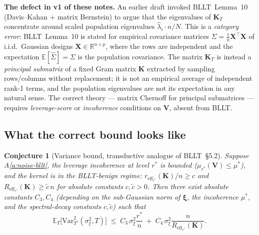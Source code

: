 \documentclass[11pt,a4paper]{article}
\theoremstyle{plain}
\newtheorem{conjecture}[theorem]{Conjecture}
\theoremstyle{definition}
\theoremstyle{remark}
\newcommand{\bxi}{\boldsymbol{\xi}}
\newcommand{\bK}{\mathbf{K}}
\newcommand{\bX}{\mathbf{X}}
\newcommand{\bV}{\mathbf{V}}
\newcommand{\E}{\mathbb{E}}
\newcommand{\R}{\mathbb{R}}
\newcommand{\reff}{r_{\mathrm{eff}}}
\newcommand{\Reff}{R_{\mathrm{eff}}}
\begin{document}
\textbf{The defect in v1 of these notes.}  An earlier draft invoked
BLLT~Lemma~10 (Davis--Kahan + matrix Bernstein) to argue that the
eigenvalues of $\bK_T$ concentrate around scaled population
eigenvalues $\hat\lambda_i \cdot n/N$. This is a \emph{category
error}: BLLT~Lemma~10 is stated for empirical covariance matrices
$\hat\Sigma = \frac{1}{n}\bX^\top\bX$ of i.i.d.\ Gaussian designs
$\bX \in \R^{n \times p}$, where the rows are independent and the
expectation $\E[\hat\Sigma] = \Sigma$ is the population covariance.
The matrix $\bK_T$ is instead a \emph{principal submatrix} of a
fixed Gram matrix $\bK$ extracted by sampling rows/columns without
replacement; it is not an empirical average of independent rank-1
terms, and the population eigenvalues are not its expectation in
any natural sense. The correct theory --- matrix Chernoff for
principal submatrices --- requires \emph{leverage-score} or
\emph{incoherence} conditions on $\bV$, absent from BLLT.

\subsection{What the correct bound looks like}

\begin{conjecture}[Variance bound, transductive analogue of BLLT~\S5.2]
\label{conj:var}
Suppose A\ref{a:noise-bllt}, the leverage incoherence at level
$r^*$ is bounded ($\mu_{r^*}(\bV) \le \mu^*$), and the kernel is
in the BLLT-benign regime: $\reff_{r^*}(\bK)/n \ge c$ and
$\Reff_{r^*}(\bK) \ge \tilde c\, n$ for absolute constants
$c, \tilde c > 0$. Then there exist absolute constants $C_3, C_4$
(depending on the sub-Gaussian norm of $\bxi$, the incoherence
$\mu^*$, and the spectral-decay constants $c, \tilde c$) such that
\begin{equation}
    \E_T\!\big[\mathrm{Var}_{T^c}^2(\sigma_\xi^2, T)\big]
    \;\le\; C_3\,\sigma_\xi^2\frac{r^*}{n}
        \;+\; C_4\,\sigma_\xi^2 \frac{n}{\Reff_{r^*}(\bK)}.
    \label{eq:var-conjecture}
\end{equation}
\end{conjecture}
\end{document}
